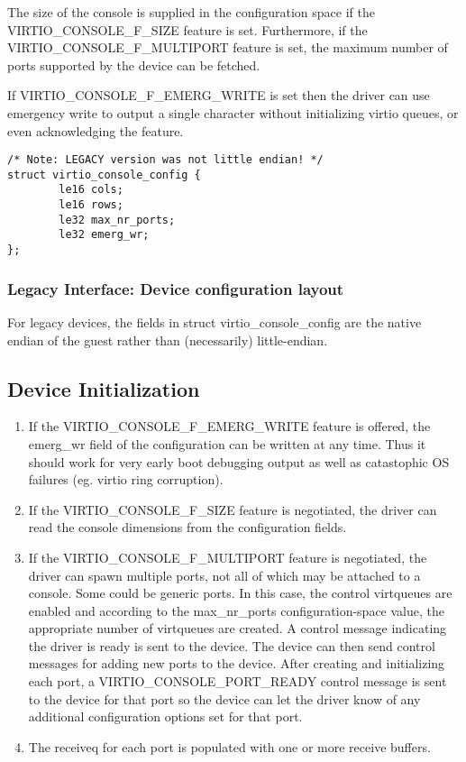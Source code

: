   The size of the console is supplied
  in the configuration space if the VIRTIO_CONSOLE_F_SIZE feature
  is set. Furthermore, if the VIRTIO_CONSOLE_F_MULTIPORT feature
  is set, the maximum number of ports supported by the device can
  be fetched.

  If VIRTIO_CONSOLE_F_EMERG_WRITE is set then the driver can use emergency write
  to output a single character without initializing virtio queues, or even
  acknowledging the feature.

\begin{lstlisting}
/* Note: LEGACY version was not little endian! */
struct virtio_console_config {
        le16 cols;
        le16 rows;
        le32 max_nr_ports;
        le32 emerg_wr;
};
\end{lstlisting}

\subsubsection{Legacy Interface: Device configuration layout}\label{sec:Device Types / Console Device / Device configuration layout / Legacy Interface: Device configuration layout}
For legacy devices, the fields in struct virtio_console_config are the
native endian of the guest rather than (necessarily) little-endian.

\subsection{Device Initialization}\label{sec:Device Types / Console Device / Device Initialization}

\begin{enumerate}
\item If the VIRTIO_CONSOLE_F_EMERG_WRITE feature is offered, the
  emerg_wr field of the configuration can be written at any time.
  Thus it should work for very early boot debugging output as well as
  catastophic OS failures (eg. virtio ring corruption).

\item If the VIRTIO_CONSOLE_F_SIZE feature is negotiated, the driver
  can read the console dimensions from the configuration fields.

\item If the VIRTIO_CONSOLE_F_MULTIPORT feature is negotiated, the
  driver can spawn multiple ports, not all of which may be
  attached to a console. Some could be generic ports. In this
  case, the control virtqueues are enabled and according to the
  max_nr_ports configuration-space value, the appropriate number
  of virtqueues are created. A control message indicating the
  driver is ready is sent to the device. The device can then send
  control messages for adding new ports to the device. After
  creating and initializing each port, a
  VIRTIO_CONSOLE_PORT_READY control message is sent to the device
  for that port so the device can let the driver know of any additional
  configuration options set for that port.

\item The receiveq for each port is populated with one or more
  receive buffers.
\end{enumerate}

